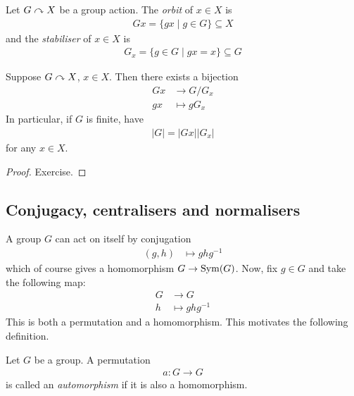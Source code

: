 \documentclass{../../template/note}
\begin{document}
    \begin{definition}
        Let $G \curvearrowright X$ be a group action. The \emph{orbit} of $x \in X$ is
        \begin{align*}
            Gx = \{gx \mid g \in G\} \subseteq X
        \end{align*}
        and the \emph{stabiliser} of $x \in X$ is
        \begin{align*}
            G_x = \{g \in G \mid gx = x\} \subseteq G
        \end{align*}
    \end{definition}
    
    \begin{theorem}
        Suppose $G \curvearrowright X$, $x \in X$. Then there exists a bijection
        \begin{align*}
            Gx &\to G/G_x \\
            gx &\mapsto gG_x
        \end{align*}
        In particular, if $G$ is finite, have
        \begin{align*}
            |G| = |Gx||G_x|
        \end{align*}
        for any $x \in X$.       
    \end{theorem}
    
    \begin{proof}
        Exercise.
    \end{proof}
    
    \subsection{Conjugacy, centralisers and normalisers}

    A group $G$ can act on itself by conjugation
    \begin{align*}
        (g, h) &\mapsto ghg^{-1}
    \end{align*}
    which of course gives a homomorphism $G \to \operatorname{Sym}(G)$. Now, fix $g \in G$ and take the following map:
    \begin{align*}
        G &\to G \\
        h &\mapsto ghg^{-1}
    \end{align*}
    This is both a permutation and a homomorphism. This motivates the following definition.

    \begin{definition}[Automorphism]
        Let $G$ be a group. A permutation
        \begin{align*}
            a: G \to G
        \end{align*}
        is called an \emph{automorphism} if it is also a homomorphism.
    \end{definition}
    
\end{document}
